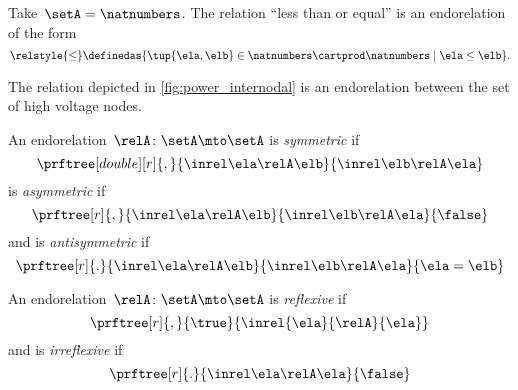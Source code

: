 \begin{example}
    Take~$\setA=\natnumbers$.
    The relation ``less than or equal'' is an endorelation of the form
    \begin{equation}
        \relstyle{\leq} \definedas  \{\tup{\ela,\elb}\in \natnumbers\cartprod \natnumbers\mid \ela \leq \elb\}.
    \end{equation}
\end{example}

\begin{example}
    The relation depicted in \cref{fig:power_internodal} is an endorelation between the set of high voltage nodes.
\end{example}

\begin{ctdefinition}
    \label{def:endo_sym_asym_antisym}
    An endorelation~$\relA\colon \setA\mto \setA$ is \emph{symmetric} if
    \begin{equation}
            \prftree[double][r]{,}{
                \inrel \ela \relA \elb
            }{
                \inrel \elb \relA \ela
            }
        \end{equation}
    is \emph{asymmetric} if
    \begin{equation}
    \prftree[r]{,}{
            \inrel \ela \relA \elb
        }{
            \inrel \elb \relA \ela
        }{
            \false
        }
    \end{equation}
    and is \emph{antisymmetric} if
    \begin{equation}
    \prftree[r]{.}{
            \inrel \ela \relA \elb
        }{
            \inrel \elb \relA \ela
        }{
            \ela = \elb
        }
    \end{equation}
\end{ctdefinition}

\begin{ctdefinition}
    \label{def:endo_reflexive_irreflexive}
An endorelation~$\relA\colon \setA\mto \setA$ is \emph{reflexive} if
\begin{equation}
\prftree[r]{,}{\true}{\inrel{\ela}{\relA}{\ela}}
\end{equation}
and is \emph{irreflexive} if
\begin{equation}
\prftree[r]{.}{
            \inrel \ela \relA \ela
        }{
            \false
        }
\end{equation}
\end{ctdefinition}

